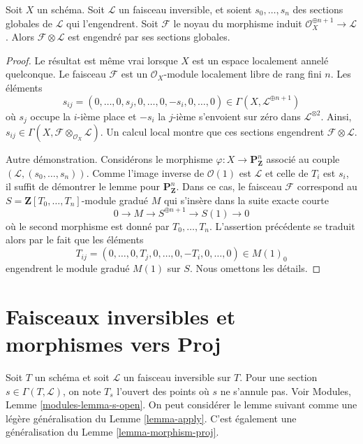 \begin{lemma}
\label{lemma-globally-generated-omega-twist-1}
Soit $X$ un schéma. Soit $\mathcal{L}$ un faisceau inversible, et soient
$s_0, \ldots, s_n$ des sections globales de $\mathcal{L}$ qui l'engendrent.
Soit $\mathcal{F}$ le noyau du morphisme induit
$\mathcal{O}_X^{\oplus n + 1} \to \mathcal{L}$. Alors
$\mathcal{F} \otimes \mathcal{L}$ est engendré par ses sections globales.
\end{lemma}

\begin{proof}
Le résultat est même vrai lorsque $X$ est un espace localement annelé
quelconque. Le faisceau $\mathcal{F}$ est un $\mathcal{O}_X$-module localement
libre de rang fini $n$. Les éléments
$$
s_{ij} = (0, \ldots, 0, s_j, 0, \ldots, 0, -s_i, 0, \ldots, 0)
\in \Gamma(X, \mathcal{L}^{\oplus n + 1})
$$
où $s_j$ occupe la $i$-ième place et $-s_i$ la $j$-ième s'envoient sur zéro
dans $\mathcal{L}^{\otimes 2}$. Ainsi,
$s_{ij} \in \Gamma(X, \mathcal{F} \otimes_{\mathcal{O}_X} \mathcal{L})$.
Un calcul local montre que ces sections engendrent
$\mathcal{F} \otimes \mathcal{L}$.

\medskip\noindent
Autre démonstration. Considérons le morphisme
$\varphi : X \to \mathbf{P}^n_\mathbf{Z}$ associé au couple
$(\mathcal{L}, (s_0, \ldots, s_n))$. Comme l'image inverse de
$\mathcal{O}(1)$ est $\mathcal{L}$ et
celle de $T_i$ est $s_i$, il suffit de
démontrer le lemme pour $\mathbf{P}^n_\mathbf{Z}$.
Dans ce cas, le faisceau $\mathcal{F}$ correspond au
$S = \mathbf{Z}[T_0, \ldots, T_n]$-module gradué
$M$ qui s'insère dans la suite exacte courte
$$
0 \to M \to S^{\oplus n + 1} \to S(1) \to 0
$$
où le second morphisme est donné par $T_0, \ldots, T_n$.
L'assertion précédente se traduit alors par le fait que les éléments
$$
T_{ij} = (0, \ldots, 0, T_j, 0, \ldots, 0, -T_i, 0, \ldots, 0)
\in M(1)_0
$$
engendrent le module gradué $M(1)$ sur $S$. Nous omettons les détails.
\end{proof}








\section{Faisceaux inversibles et morphismes vers Proj}
\label{section-invertible-proj}

\noindent
Soit $T$ un schéma et soit $\mathcal{L}$ un faisceau inversible sur $T$.
Pour une section $s \in \Gamma(T, \mathcal{L})$, on note $T_s$ l'ouvert
des points où $s$ ne s'annule pas. Voir Modules,
Lemme \ref{modules-lemma-s-open}. On peut considérer le lemme suivant comme
une légère généralisation du Lemme \ref{lemma-apply}. C'est également une
généralisation du Lemme \ref{lemma-morphism-proj}.

